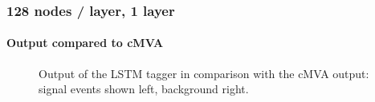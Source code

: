 \documentclass{beamer}
\begin{document}
\begin{frame}
  \frametitle{128 nodes / layer, 1 layer}
  \framesubtitle{Output compared to cMVA}
  \begin{figure}[htb]
    \centering

    \caption{Output of the LSTM tagger in comparison with the cMVA output: signal events shown left, background right.}
  \end{figure}
\end{frame}
\end{document}
